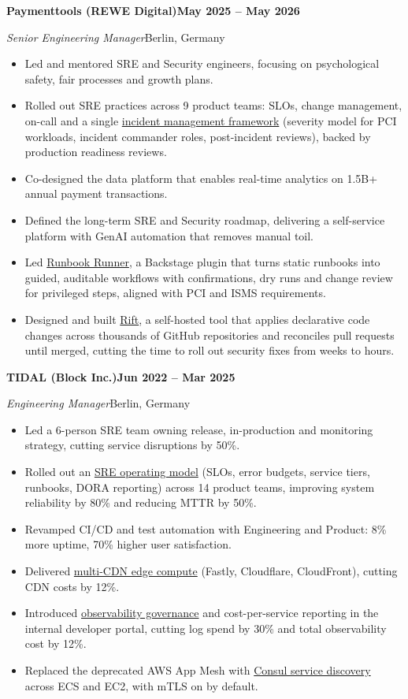 \documentclass[10pt,a4paper]{article}
\newcommand{\job}[4]{%
  \par\addvspace{0.9ex}%
  {\bfseries #1}\hfill{\bfseries #2}\par
  {\itshape #3}\hfill{\color{muted}#4}\par}
\begin{document}
\job{Paymenttools (REWE Digital)}{May 2025 -- May 2026}{Senior Engineering Manager}{Berlin, Germany}
\begin{itemize}
  \item Led and mentored SRE and Security engineers, focusing on psychological safety, fair processes and growth plans.
  \item Rolled out SRE practices across 9 product teams: SLOs, change management, on-call and a single \href{https://rajatgupta.work/projects/incident-management-process/}{incident management framework} (severity model for PCI workloads, incident commander roles, post-incident reviews), backed by production readiness reviews.
  \item Co-designed the data platform that enables real-time analytics on 1.5B+ annual payment transactions.
  \item Defined the long-term SRE and Security roadmap, delivering a self-service platform with GenAI automation that removes manual toil.
  \item Led \href{https://rajatgupta.work/projects/actionable-runbooks/}{Runbook Runner}, a Backstage plugin that turns static runbooks into guided, auditable workflows with confirmations, dry runs and change review for privileged steps, aligned with PCI and ISMS requirements.
  \item Designed and built \href{https://rajatgupta.work/projects/rift/}{Rift}, a self-hosted tool that applies declarative code changes across thousands of GitHub repositories and reconciles pull requests until merged, cutting the time to roll out security fixes from weeks to hours.
\end{itemize}

\job{TIDAL (Block Inc.)}{Jun 2022 -- Mar 2025}{Engineering Manager}{Berlin, Germany}
\begin{itemize}
  \item Led a 6-person SRE team owning release, in-production and monitoring strategy, cutting service disruptions by 50\%.
  \item Rolled out an \href{https://rajatgupta.work/projects/sre-operating-model/}{SRE operating model} (SLOs, error budgets, service tiers, runbooks, DORA reporting) across 14 product teams, improving system reliability by 80\% and reducing MTTR by 50\%.
  \item Revamped CI/CD and test automation with Engineering and Product: 8\% more uptime, 70\% higher user satisfaction.
  \item Delivered \href{https://rajatgupta.work/projects/edge-compute-streaming/}{multi-CDN edge compute} (Fastly, Cloudflare, CloudFront), cutting CDN costs by 12\%.
  \item Introduced \href{https://rajatgupta.work/projects/observability-governance-idp/}{observability governance} and cost-per-service reporting in the internal developer portal, cutting log spend by 30\% and total observability cost by 12\%.
  \item Replaced the deprecated AWS App Mesh with \href{https://rajatgupta.work/projects/service-discovery-modernization/}{Consul service discovery} across ECS and EC2, with mTLS on by default.
\end{itemize}
\end{document}
